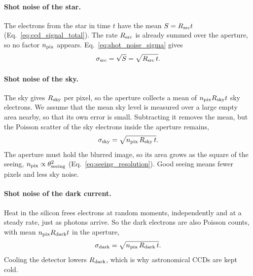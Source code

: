 \paragraph{Shot noise of the star.} The electrons from the star in time $t$ have the mean $S=R_{\rm src}t$ (Eq.~\eqref{eq:ccd_signal_total}). The rate $R_{\rm src}$ is already summed over the aperture, so no factor $n_{\rm pix}$ appears. Eq.~\eqref{eq:shot_noise_sigma} gives
\begin{equation}
	\sigma_{\rm src} = \sqrt{S} = \sqrt{R_{\rm src}\,t}.
	\label{eq:sigma_src}
\end{equation}

\paragraph{Shot noise of the sky.} The sky gives $R_{\rm sky}$ per pixel, so the aperture collects a mean of $n_{\rm pix}R_{\rm sky}t$ sky electrons. We assume that the mean sky level is measured over a large empty area nearby, so that its own error is small. Subtracting it removes the mean, but the Poisson scatter of the sky electrons inside the aperture remains,
\begin{equation}
	\sigma_{\rm sky} = \sqrt{n_{\rm pix}\,R_{\rm sky}\,t}.
	\label{eq:sigma_sky}
\end{equation}
The aperture must hold the blurred image, so its area grows as the square of the seeing, $n_{\rm pix}\propto\theta_{\rm seeing}^2$ (Eq.~\eqref{eq:seeing_resolution}). Good seeing means fewer pixels and less sky noise.

\paragraph{Shot noise of the dark current.} Heat in the silicon frees electrons at random moments, independently and at a steady rate, just as photons arrive. So the dark electrons are also Poisson counts, with mean $n_{\rm pix}R_{\rm dark}t$ in the aperture,
\begin{equation}
	\sigma_{\rm dark} = \sqrt{n_{\rm pix}\,R_{\rm dark}\,t}.
	\label{eq:sigma_dark}
\end{equation}
Cooling the detector lowers $R_{\rm dark}$, which is why astronomical CCDs are kept cold.

